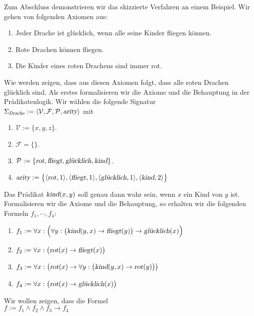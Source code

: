 \example
Zum Abschluss demonstrieren wir das skizzierte Verfahren an einem Beispiel.
Wir gehen von folgenden Axiomen aus:
\begin{enumerate}
\item Jeder Drache ist gl\"{u}cklich, wenn alle seine Kinder fliegen k\"{o}nnen.
\item Rote Drachen k\"{o}nnen fliegen.
\item Die Kinder eines roten Drachens sind immer rot.
\end{enumerate}
Wie werden zeigen, dass aus diesen Axiomen folgt, dass alle roten Drachen gl\"{u}cklich sind.
Als erstes formalisieren wir die Axiome und die Behauptung in der Pr\"{a}dikatenlogik.
Wir w\"{a}hlen die folgende Signatur \\[0.2cm]
\hspace*{1.3cm}  $\Sigma_\textsl{Drache} := \langle \mathcal{V}, \mathcal{F}, \mathcal{P}, \textsl{arity} \rangle$ \quad mit
\begin{enumerate}
\item $\mathcal{V} := \{x,y,z\}$.
\item $\mathcal{F} = \{\}$.
\item $\mathcal{P} := \{ \textsl{rot}, \textsl{fliegt}, \textsl{gl\"{u}cklich}, \textsl{kind} \}$.
\item $\textsl{arity} := \bigl\{ \pair(\textsl{rot},1), \pair(\textsl{fliegt},1),
  \pair(\textsl{gl\"{u}cklich},1), \pair(\textsl{kind},2)\bigr\}$
\end{enumerate}
Das Pr\"{a}dikat  $\textsl{kind}(x,y)$ soll genau dann wahr sein, wenn $x$ ein Kind von $y$ ist.
Formalisieren wir die Axiome und die Behauptung, so erhalten wir die folgenden
Formeln $f_1, \cdots, f_4$:
\begin{enumerate}
\item $f_1 := \forall x: \Bigl(\forall y: \big(\textsl{kind}(y,x) \rightarrow \textsl{fliegt}(y)\big) \rightarrow \textsl{gl\"{u}cklich}(x)\Bigr)$
\item $f_2 := \forall x: \bigl(\textsl{rot}(x) \rightarrow \textsl{fliegt}(x)\bigr)$
\item $f_3 := \forall x: \bigl(\textsl{rot}(x) \rightarrow \forall y:\bigl( \textsl{kind}(y,x) \rightarrow \textsl{rot}(y)\bigr)\bigr)$
\item $f_4 := \forall x: \bigl(\textsl{rot}(x) \rightarrow \textsl{gl\"{u}cklich}(x)\bigr)$
\end{enumerate}
Wir wollen zeigen, dass die Formel \\[0.2cm]
\hspace*{1.3cm} $f := f_1 \wedge f_2 \wedge f_3 \rightarrow f_4$ \\[0.2cm]
